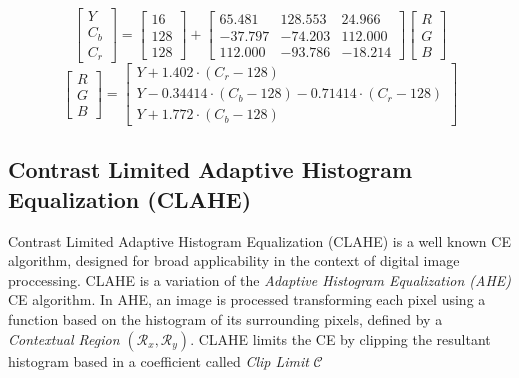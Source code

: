 \documentclass[11pt]{article}
\begin{document}
\begin{equation}
\begin{bmatrix}
    Y \\
    C_b \\
    C_r 
\end{bmatrix} =
 \begin{bmatrix}
    16  \\
    128 \\
    128
\end{bmatrix}
+
 \begin{bmatrix}
    65.481 & 128.553 & 24.966 \\
    -37.797 & -74.203 & 112.000 \\
    112.000 & -93.786 & -18.214 
\end{bmatrix}
\begin{bmatrix}
   R \\
   G \\
   B 
\end{bmatrix}
\end{equation}
\begin{equation}
\begin{bmatrix}
    R \\
    G \\
    B 
\end{bmatrix} =
 \begin{bmatrix}
    Y + 1.402 \cdot (C_r - 128) \\
    Y -0.34414 \cdot (C_b - 128) - 0.71414 \cdot (C_r - 128) \\
    Y + 1.772 \cdot  (C_b - 128) 
\end{bmatrix}
\end{equation}

\subsection{Contrast Limited Adaptive Histogram Equalization (CLAHE)}

Contrast Limited Adaptive Histogram Equalization (CLAHE) \cite{zuiderveld1994contrast} is a well known CE algorithm, designed for broad applicability in the context of digital image proccessing. CLAHE is a variation of the \textit{Adaptive Histogram Equalization (AHE)}\cite{pizer1987adaptive} CE algorithm. In AHE, an image is processed transforming each pixel using a function based on the histogram of its surrounding pixels, defined by a \textit{Contextual Region $(\mathscr{R}_x,\mathscr{R}_y)$}. CLAHE limits the CE by clipping the resultant histogram based in a coefficient called \textit{Clip Limit} $\mathscr{C}$
\end{document}
